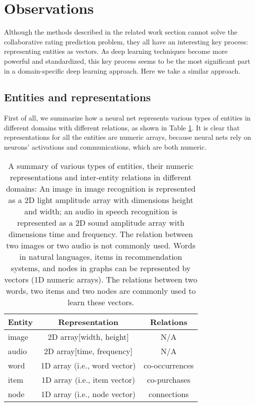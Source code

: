 \documentclass[letterpaper]{article}
\begin{document}
\section{Observations}
Although the methods described in the related work section cannot solve the 
collaborative rating prediction problem,
they all have an interesting key process: representing entities as vectors.
As deep learning techniques become more powerful and standardized, this key 
process seems to be the most significant part in a domain-specific deep 
learning approach.
Here we take a similar approach.

\subsection{Entities and representations}
First of all, we summarize how a neural net represents various types of 
entities in different domains with different relations, as shown in 
Table \ref{tab:domains}.
It is clear that representations for all the entities are numeric arrays, 
because neural nets rely on neurons' activations and communications, which 
are both numeric.
\begin{table}[!htb]
	\centering
	\caption{A summary of various types of entities, their numeric
		representations and inter-entity relations in different domains:
		An image in image recognition is represented as a 2D light amplitude 
		array with dimensions height and width; an audio in speech recognition 
		is represented as a 2D sound amplitude array with dimensions time and 
		frequency.
		The relation between two images or two audio is not commonly used. 
		Words in natural languages, items in recommendation systems, and nodes 
		in graphs can be represented by vectors (1D numeric arrays).
		The	relations between two words, two items and two nodes are commonly 
		used to learn these vectors.
	}
	\begin{tabularx}{0.47\textwidth}{|X|c|c|} \hline \rowcolor{blue!50}
		Entity & Representation               & Relations \\ \hline
		image  & 2D array[width, height]      & N/A \\ \hline
		audio  & 2D array[time, frequency]    & N/A \\ \hline
		word   & 1D array (i.e., word vector) & co-occurrences \\ \hline
		item   & 1D array (i.e., item vector) & co-purchases \\ \hline
		node   & 1D array (i.e., node vector) & connections \\ \hline
	\end{tabularx}
	\label{tab:domains}
\end{table}
\end{document}
